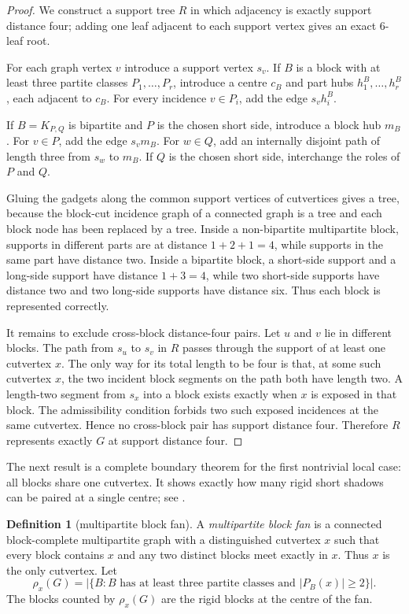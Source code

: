 \documentclass[11pt]{article}
\theoremstyle{definition}
\newtheorem{definition}[theorem]{Definition}
\begin{document}
\begin{proof}
We construct a support tree $R$ in which adjacency is exactly support distance four; adding one leaf adjacent to each support vertex gives an exact $6$-leaf root.

For each graph vertex $v$ introduce a support vertex $s_v$.  If $B$ is a block with at least three partite classes $P_1,\ldots,P_r$, introduce a centre $c_B$ and part hubs $h^B_1,\ldots,h^B_r$, each adjacent to $c_B$.  For every incidence $v\in P_i$, add the edge $s_vh^B_i$.

If $B=K_{P,Q}$ is bipartite and $P$ is the chosen short side, introduce a block hub $m_B$.  For $v\in P$, add the edge $s_vm_B$.  For $w\in Q$, add an internally disjoint path of length three from $s_w$ to $m_B$.  If $Q$ is the chosen short side, interchange the roles of $P$ and $Q$.

Gluing the gadgets along the common support vertices of cutvertices gives a tree, because the block-cut incidence graph of a connected graph is a tree and each block node has been replaced by a tree.  Inside a non-bipartite multipartite block, supports in different parts are at distance $1+2+1=4$, while supports in the same part have distance two.  Inside a bipartite block, a short-side support and a long-side support have distance $1+3=4$, while two short-side supports have distance two and two long-side supports have distance six.  Thus each block is represented correctly.

It remains to exclude cross-block distance-four pairs.  Let $u$ and $v$ lie in different blocks.  The path from $s_u$ to $s_v$ in $R$ passes through the support of at least one cutvertex $x$.  The only way for its total length to be four is that, at some such cutvertex $x$, the two incident block segments on the path both have length two.  A length-two segment from $s_x$ into a block exists exactly when $x$ is exposed in that block.  The admissibility condition forbids two such exposed incidences at the same cutvertex.  Hence no cross-block pair has support distance four.  Therefore $R$ represents exactly $G$ at support distance four.
\end{proof}


The next result is a complete boundary theorem for the first nontrivial local case: all blocks share one cutvertex.  It shows exactly how many rigid short shadows can be paired at a single centre; see .


\begin{definition}[multipartite block fan]
A \emph{multipartite block fan} is a connected block-complete multipartite graph with a distinguished cutvertex $x$ such that every block contains $x$ and any two distinct blocks meet exactly in $x$.  Thus $x$ is the only cutvertex.  Let
\[
 \rho_x(G)=|\{B: \text{$B$ has at least three partite classes and } |P_B(x)|\ge2\}|.
\]
The blocks counted by $\rho_x(G)$ are the rigid blocks at the centre of the fan.

\end{definition}
\end{document}
